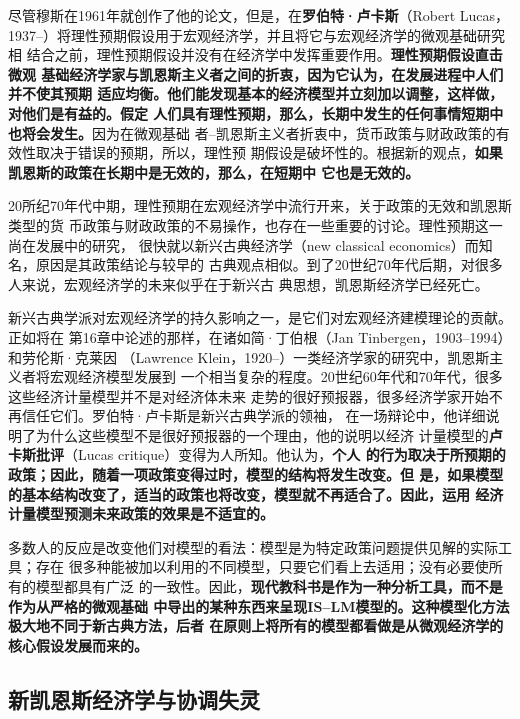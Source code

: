 尽管穆斯在1961年就创作了他的论文，但是，在\textbf{罗伯特·卢卡斯}（Robert
Lucas，1937--）将理性预期假设用于宏观经济学，并且将它与宏观经济学的微观基础研究相
结合之前，理性预期假设并没有在经济学中发挥重要作用。\textbf{理性预期假设直击微观
  基础经济学家与凯恩斯主义者之间的折衷，因为它认为，在发展进程中人们并不使其预期
  适应均衡。他们能发现基本的经济模型并立刻加以调整，这样做，对他们是有益的。假定
  人们具有理性预期，那么，长期中发生的任何事情短期中也将会发生。}因为在微观基础
者--凯恩斯主义者折衷中，货币政策与财政政策的有效性取决于错误的预期，所以，理性预
期假设是破坏性的。根据新的观点，\textbf{如果凯恩斯的政策在长期中是无效的，那么，在短期中
它也是无效的。}

20所纪70年代中期，理性预期在宏观经济学中流行开来，关于政策的无效和凯恩斯类型的货
币政策与财政政策的不易操作，也存在一些重要的讨论。理性预期这一尚在发展中的研究，
很快就以新兴古典经济学（new classical economics）而知名，原因是其政策结论与较早的
古典观点相似。到了20世纪70年代后期，对很多人来说，宏观经济学的未来似乎在于新兴古
典思想，凯恩斯经济学已经死亡。

新兴古典学派对宏观经济学的持久影响之一，是它们对宏观经济建模理论的贡献。正如将在
第16章中论述的那样，在诸如简·丁伯根（Jan Tinbergen，1903--1994）和劳伦斯·克莱因
（Lawrence Klein，1920--）一类经济学家的研究中，凯恩斯主义者将宏观经济模型发展到
一个相当复杂的程度。20世纪60年代和70年代，很多这些经济计量模型并不是对经济体未来
走势的很好预报器，很多经济学家开始不再信任它们。罗伯特·卢卡斯是新兴古典学派的领袖，
在一场辩论中，他详细说明了为什么这些模型不是很好预报器的一个理由，他的说明以经济
计量模型的\textbf{卢卡斯批评}（Lucas critique）变得为人所知。他认为，\textbf{个人
  的行为取决于所预期的政策；因此，随着一项政策变得过时，模型的结构将发生改变。但
  是，如果模型的基本结构改变了，适当的政策也将改变，模型就不再适合了。因此，运用
  经济计量模型预测未来政策的效果是不适宜的。}

多数人的反应是改变他们对模型的看法：模型是为特定政策问题提供见解的实际工具；存在
很多种能被加以利用的不同模型，只要它们看上去适用；没有必要使所有的模型都具有广泛
的一致性。因此，\textbf{现代教科书是作为一种分析工具，而不是作为从严格的微观基础
  中导出的某种东西来呈现IS--LM模型的。这种模型化方法极大地不同于新古典方法，后者
  在原则上将所有的模型都看做是从微观经济学的核心假设发展而来的。}

\subsection{新凯恩斯经济学与协调失灵}

